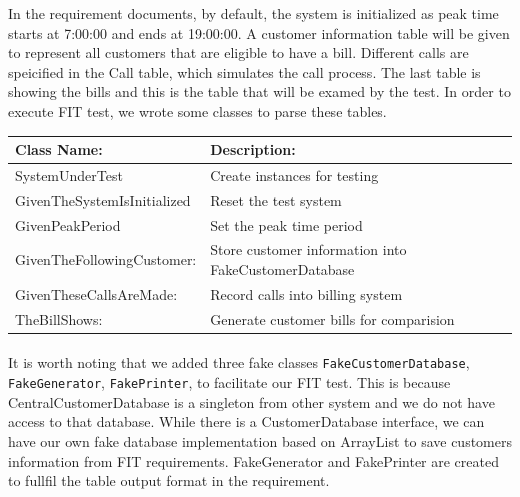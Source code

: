 \documentclass[a4paper,12pt,oneside,final]{article}
\begin{document}
In the requirement documents, by default, the system is initialized as peak time starts at 7:00:00 and ends at 19:00:00. A customer information table will be given to represent all customers that are eligible to have a bill. Different calls are speicified in the Call table, which simulates the call process. The last table is showing the bills and this is the table that will be examed by the test. In order to execute FIT test, we wrote some classes to parse these tables. 
\begin{center}
    \begin{tabular}{ | l | p{8cm} |}
    \hline
    Class Name: &  Description: \\  \hline
    SystemUnderTest  & Create instances for testing \\  \hline
    GivenTheSystemIsInitialized & Reset the test system \\  \hline
    GivenPeakPeriod  & Set the peak time period \\  \hline
    GivenTheFollowingCustomer: & Store customer information into FakeCustomerDatabase\\  \hline
    GivenTheseCallsAreMade: & Record calls into billing system \\  \hline
   TheBillShows: & Generate customer bills for comparision \\
   \hline
    \end{tabular}
\end{center}

\paragraph{}
It is worth noting that we added three fake classes  \verb+FakeCustomerDatabase+, \verb+FakeGenerator+, \verb+FakePrinter+, to facilitate our FIT test. This is because CentralCustomerDatabase is a singleton from other system and we do not have access to that database. While there is a CustomerDatabase interface, we can have our own fake database implementation based on ArrayList to save customers information from FIT requirements. FakeGenerator and FakePrinter are created to fullfil the table output format in the requirement. 
\end{document}
